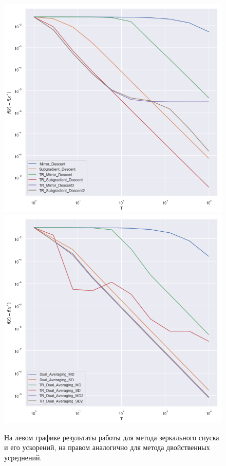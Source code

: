 \documentclass[a4paper,12pt]{article}
\theoremstyle{plain} %
\theoremstyle{definition} %
\theoremstyle{remark} %
\theoremstyle{definition}
\theoremstyle{definition}
\begin{document}
  \begin{figure}[!htb]
    \includegraphics[width=\linewidth]{MD.png}
    \endminipage\hfill
    \includegraphics[width=\linewidth]{DA.png}
    \endminipage
    \caption{На левом графике результаты работы для метода зеркального спуска и его ускорений, на правом аналогично для метода двойственных усреднений.}
  \end{figure}
\end{document}
